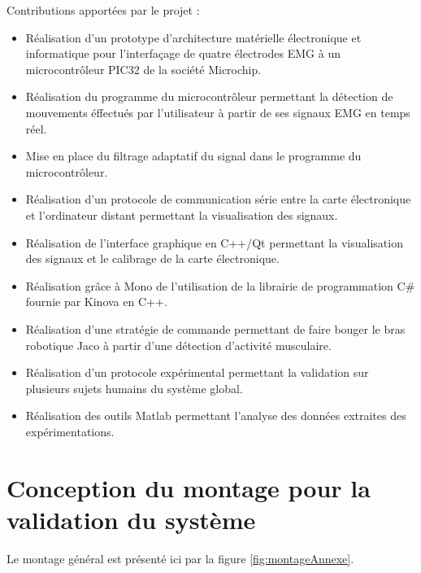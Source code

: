 \documentclass[letterpaper, twoside, 12pt, memoire, creativecommons, hyperref]{thETS}
\begin{document}
\begin{contributions}

Contributions apportées par le projet :

\begin{itemize}
 \item Réalisation d'un prototype d'architecture matérielle électronique et informatique pour l'interfaçage de quatre électrodes EMG à un microcontrôleur PIC32 de la société Microchip.
 \item Réalisation du programme du microcontrôleur permettant la détection de mouvements éffectués par l'utilisateur à partir de ses signaux EMG en temps réel.
 \item Mise en place du filtrage adaptatif du signal dans le programme du microcontrôleur.
 \item Réalisation d'un protocole de communication série entre la carte électronique et l'ordinateur distant permettant la visualisation des signaux.
 \item Réalisation de l'interface graphique en C++/Qt permettant la visualisation des signaux et le calibrage de la carte électronique.
 \item Réalisation grâce à Mono de l'utilisation de la librairie de programmation C\# fournie par Kinova en C++.
 \item Réalisation d'une stratégie de commande permettant de faire bouger le bras robotique Jaco à partir d'une détection d'activité musculaire.
 \item Réalisation d'un protocole expérimental permettant la validation sur plusieurs sujets humains du système global.
 \item Réalisation des outils Matlab permettant l'analyse des données extraites des expérimentations.
\end{itemize}

\end{contributions}


\appendix


\multiannexe %
%
\chapter{Conception du montage pour la validation du système} 
\label{annexemontage}

Le montage général est présenté ici par la figure \ref{fig:montageAnnexe}.
\end{document}
